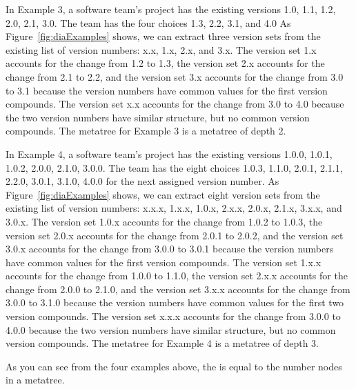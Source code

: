 \documentclass[conference]{IEEEtran}
\begin{document}

In Example 3, a software team's project has the existing versions 1.0, 1.1, 1.2, 2.0, 2.1, 3.0. The team has the four choices 1.3, 2.2, 3.1, and 4.0 
As Figure~\ref{fig:diaExamples} shows, we can extract three version sets from the existing list of version numbers: x.x, 1.x, 2.x, and 3.x. 
The version set 1.x accounts for the change from 1.2 to 1.3, the version set 2.x accounts for the change from 2.1 to 2.2, and the version set 3.x accounts for the change from 3.0 to 3.1 because the version numbers have common values for the first version compounds. 
The version set x.x accounts for the change from 3.0 to 4.0 because the two version numbers have similar structure, but no common version compounds.
The metatree for Example 3 is a metatree of depth 2.

In Example 4, a software team's project has the existing versions 1.0.0, 1.0.1, 1.0.2, 2.0.0, 2.1.0, 3.0.0.
 The team has the eight choices 1.0.3, 1.1.0, 2.0.1, 2.1.1, 2.2.0, 3.0.1, 3.1.0, 4.0.0 for the next assigned version number. 
As Figure~\ref{fig:diaExamples} shows, we can extract eight version sets from the existing list of version numbers: x.x.x, 1.x.x, 1.0.x, 2.x.x, 2.0.x, 2.1.x, 3.x.x, and 3.0.x. 
The version set 1.0.x accounts for the change from 1.0.2 to 1.0.3, the version set 2.0.x accounts for the change from 2.0.1 to 2.0.2, and the version set 3.0.x accounts for the change from 3.0.0 to 3.0.1 because the version numbers have common values for the first version compounds. 
The version set 1.x.x accounts for the change from 1.0.0 to 1.1.0, the version set 2.x.x accounts for the change from 2.0.0 to 2.1.0, and the version set 3.x.x accounts for the change from 3.0.0 to 3.1.0 because the version numbers have common values for the first two version compounds. 
The version set x.x.x accounts for the change from 3.0.0 to 4.0.0 because the two version numbers have similar structure, but no common version compounds.
The metatree for Example 4 is a metatree of depth 3.

As you can see from the four examples above, the \numberchoices is equal to the number nodes in a metatree.

 
\end{document}
